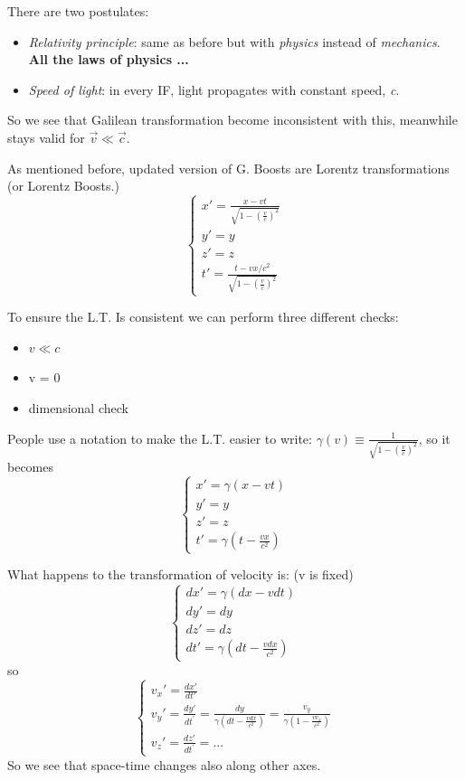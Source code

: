 There are two postulates: \par
\begin{itemize}
	\item \emph{Relativity principle}: same as before but with \emph{physics} instead of \emph{mechanics}. \textbf{All the laws of physics ...}
	\item \emph{Speed of light}: in every IF, light propagates with constant speed, \emph{c}.
\end{itemize}
So we see that Galilean transformation become inconsistent with this, meanwhile stays valid for $\vec{v} \ll \vec{c}$.\par
As mentioned before, updated version of G. Boosts are Lorentz transformations (or Lorentz Boosts.)
\begin{equation}
\begin{cases}
	x' = \frac{x-vt}{\sqrt{1-(\frac{v}{c})^{2}}} \\
	y' = y \\
	z' = z \\
	t' = \frac{t- vx/c^{2}}{\sqrt{1-(\frac{v}{c})^{2}}}
\end{cases}
\end{equation}

To ensure the L.T. Is consistent we can perform three different checks:
\begin{itemize}
	\item $v \ll c$
	\item v = 0
	\item dimensional check
\end{itemize}
People use a notation to make the L.T. easier to write: $\gamma(v) \equiv \frac{1}{\sqrt{1-(\frac{v}{c})^{2}}} $, so it becomes
\begin{equation}
\begin{cases}
x' = \gamma (x-vt) \\
y' = y \\
z' = z \\
t' = \gamma (t- \frac{vx}{c^{2}})
\end{cases}
\end{equation}

What happens to the transformation of velocity is: (v is fixed) 
\begin{equation}
\begin{cases}
dx' = \gamma(dx -vdt) \\
dy' = dy \\
dz' = dz \\
dt' = \gamma \left(dt - \frac{v dx}{c^{2}}\right)
\end{cases}
\end{equation}
 so 
\begin{equation}
\begin{cases}
 v_{x}' = \frac{dx'}{dt'} \\
 v_{y}' = \frac{dy'}{dt^{\prime }} = \frac{dy}{\gamma \left(dt - \frac{vdx}{c^{2}}\right)} = \frac{v_{y}}{\gamma \left(1- \frac{v v_{x}}{c^{2}}\right)} \\
v_{z}' = \frac{dz'}{dt^{\prime }} = ...
\end{cases}
\end{equation}
So we see that space-time changes also along other axes.\par

